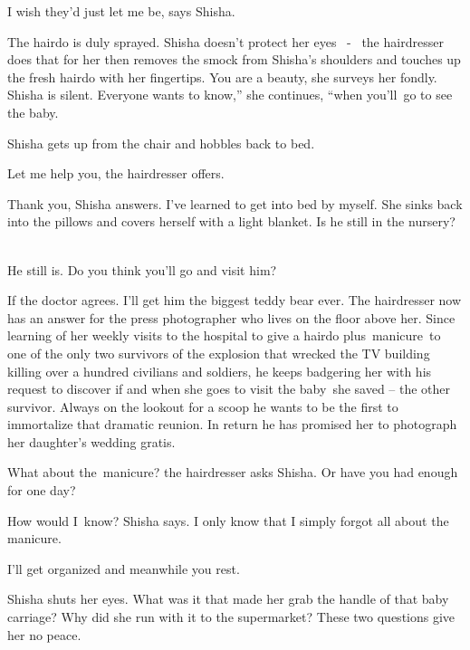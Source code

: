 \documentclass[letterpaper]{article}
\begin{document}
{\textquotedbl}I wish they'd just let me be,{\textquotedbl} says Shisha\textcolor[rgb]{0.0,0.4392157,0.7529412}{.}

The hairdo is duly sprayed. Shisha doesn't protect\textcolor[rgb]{0.0,0.4392157,0.7529412}{ }her eyes
\ \textcolor[rgb]{0.0,0.4392157,0.7529412}{{}- }\ the hairdresser does that for her then removes the smock from
Shisha's shoulders and touches up the fresh hairdo with her fingertips. {\textquotedbl}You are a beauty,{\textquotedbl}
she surveys her fondly. Shisha is silent. {\textquotedbl}Everyone wants to know,'' she continues, ``when you'll~go to
see the baby.{\textquotedbl} 

Shisha gets up from the chair and hobbles back to bed. 

{\textquotedbl}Let me help you,{\textquotedbl} the hairdresser offers.

{\textquotedbl}Thank you,{\textquotedbl} Shisha answers. {\textquotedbl}I've learned to get into bed by
myself.{\textquotedbl} She sinks back into the pillows and covers herself with a light blanket. {\textquotedbl}Is he
still in the nursery?{\textquotedbl} \ 

{\textquotedbl}He still is. Do you think you'll go and visit him?{\textquotedbl} 

{\textquotedbl}If the doctor agrees. I'll get him the biggest teddy bear ever.{\textquotedbl} The hairdresser now has an
answer for the press photographer who lives on the floor above her. Since learning of her weekly visits to the hospital
to give a hairdo plus~manicure~to one of the only two survivors of the explosion that wrecked the TV building killing
over a hundred civilians and soldiers, he keeps badgering her with his request to discover if and when she goes to
visit the baby~she saved -- the other survivor. Always on the lookout for a scoop he wants to be the first to
immortalize that dramatic reunion. In return he has promised her to photograph her daughter's wedding gratis.~ 

{\textquotedbl}What about the~manicure?{\textquotedbl} the hairdresser asks Shisha. {\textquotedbl}Or have you had
enough for one day?{\textquotedbl} 

{\textquotedbl}How would I~know?{\textquotedbl} Shisha says. {\textquotedbl}I only know that I simply forgot all about
the manicure.{\textquotedbl} 

{\textquotedbl}I'll get organized and meanwhile you rest.{\textquotedbl} 

Shisha shuts her eyes. What was it that made her grab the handle of that baby carriage? Why did she run with it to the
supermarket? These two questions give her no peace. 
\end{document}
